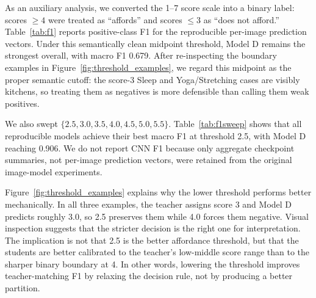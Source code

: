 \documentclass[10pt,twocolumn]{article}
\newcommand{\figref}[1]{Figure~\ref{#1}}
\newcommand{\tabref}[1]{Table~\ref{#1}}
\begin{document}
As an auxiliary analysis, we converted the 1--7 score scale into a binary
label: scores $\geq 4$ were treated as ``affords'' and scores $\leq 3$ as
``does not afford.'' \tabref{tab:f1} reports positive-class F1 for the
reproducible per-image prediction vectors. Under this semantically clean
midpoint threshold, Model D remains the strongest overall, with macro F1
0.679. After re-inspecting the boundary examples in \figref{fig:threshold_examples},
we regard this midpoint as the proper semantic cutoff: the score-3 Sleep and
Yoga/Stretching cases are visibly kitchens, so treating them as negatives is
more defensible than calling them weak positives.

We also swept $\{2.5, 3.0, 3.5, 4.0, 4.5, 5.0, 5.5\}$.
\tabref{tab:f1sweep} shows that all reproducible models achieve their best
macro F1 at threshold 2.5, with Model D reaching 0.906. We do not report CNN F1
because only aggregate checkpoint summaries, not per-image prediction vectors,
were retained from the original image-model experiments.

\figref{fig:threshold_examples} explains why the lower threshold performs
better mechanically. In all three examples, the teacher assigns score 3 and
Model D predicts roughly 3.0, so 2.5 preserves them while 4.0 forces them
negative. Visual inspection suggests that the stricter decision is the right
one for interpretation. The implication is not that 2.5 is the better
affordance threshold, but that the students are better calibrated to the
teacher's low-middle score range than to the sharper binary boundary at 4. In
other words, lowering the threshold improves teacher-matching F1 by relaxing
the decision rule, not by producing a better partition.

\begin{table}[t]
\centering
\small
\caption{Auxiliary thresholded classification analysis. Positive class is
defined as VLM score $\geq 4$; entries report positive-class F1.}
\label{tab:f1}
\end{table}
\end{document}
